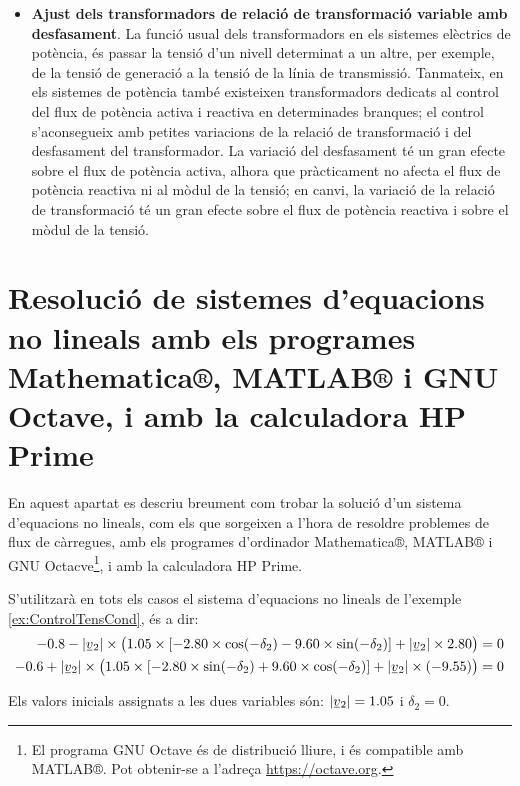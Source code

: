 \begin{itemize}
   \item \textbf{Ajust  dels transformadors de relació de transformació variable amb   desfasament}. La funció usual dels transformadors en els sistemes elèctrics de potència,
    és passar la tensió d'un nivell determinat a un altre, per exemple, de la tensió de generació
    a la tensió de la línia de transmissió. Tanmateix, en els sistemes de potència també existeixen
    transformadors dedicats al control del flux de potència activa i reactiva en determinades
    branques; el control s'aconsegueix amb petites variacions de la relació de transformació i del
    desfasament del transformador. La variació del desfasament té un gran efecte sobre el flux
    de potència activa, alhora que pràcticament no afecta el flux de potència reactiva ni al
    mòdul de la tensió; en canvi, la variació de la relació de transformació té un gran efecte
    sobre el flux de potència reactiva i sobre el mòdul de la tensió.
\end{itemize}

\section{Resolució de sistemes d'equacions no lineals amb els programes Mathematica®, MATLAB® i GNU Octave,  i amb la calculadora \textsf{HP Prime}}
\label{sec:sis_eq_no_lin}


En aquest apartat es descriu breument com trobar la solució d'un sistema d'equacions no lineals, com els que sorgeixen a l'hora de resoldre problemes de flux de càrregues, amb els programes d'ordinador Mathematica®, MATLAB® i GNU Octacve\footnote{El programa GNU Octave és de distribució lliure, i és compatible amb MATLAB®. Pot obtenir-se a l'adreça \href{https://octave.org/}{https:/\!\!/octave.org}.}, i amb la calculadora \textsf{HP Prime}.

S'utilitzarà en tots els casos el sistema d'equacions no lineals de l'exemple \vref{ex:ControlTensCond}, és a dir:
\begin{align*}
\num{-0,8} - |\cmplx{v}_2| \times \bigl( \num{1,05}\times [\num{-2,80}\times \cos(-\delta_2) - \num{9,60} \times
\sin( -\delta_2)]  + |\cmplx{v}_2| \times \num{2,80} \bigr) &= 0 \\
-\num{0,6} + |\cmplx{v}_2| \times\bigl( \num{1,05} \times[\num{-2,80}\times\sin(-\delta_2) +
\num{9,60}\times\cos( -\delta_2)]  + |\cmplx{v}_2|\times (\num{-9,55}) \bigr) &= 0
\end{align*}

Els valors inicials assignats a les dues variables són: $|\cmplx{v}_2|=\num{1,05}$ i $\delta_2=0$.

